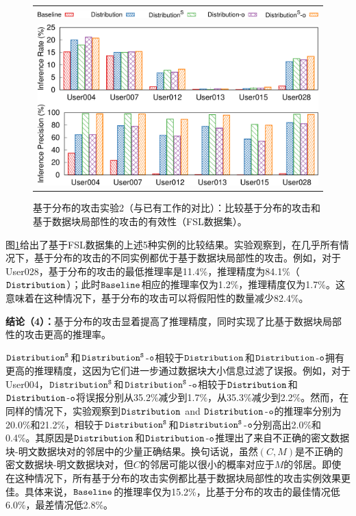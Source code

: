 \begin{figure}[!htbp]
    \centering
    \begin{tabular}{c}
        \includegraphics[width=.7\textwidth]{pic/legend-fsl-bar.pdf}\\
        \includegraphics[width=.7\textwidth]{pic/distribution-comparison-fsl.pdf} 
    \end{tabular}
    \caption{基于分布的攻击实验2（与已有工作的对比）：比较基于分布的攻击和基于数据块局部性的攻击的有效性（FSL数据集）。}
    \label{fig:distribution-comparison-fsl}
\end{figure}

图\ref{fig:distribution-comparison-fsl}给出了基于FSL数据集的上述5种实例的比较结果。实验观察到，在几乎所有情况下，基于分布的攻击的不同实例都优于基于数据块局部性的攻击。例如，对于User028，基于分布的攻击的最低推理率是11.4\%，推理精度为84.1\%（$\tt Distribution$）；此时$\tt Baseline$相应的推理率仅为1.2\%，推理精度仅为1.7\%。这意味着在这种情况下，基于分布的攻击可以将假阳性的数量减少82.4\%。

\textbf{结论（4）：}基于分布的攻击显着提高了推理精度，同时实现了比基于数据块局部性的攻击更高的推理率。 

$\tt Distribution^S$和$\tt Distribution^S$-$\tt o$相较于$\tt Distribution$和$\tt Distribution$-$\tt o$拥有更高的推理精度，这因为它们进一步通过数据块大小信息过滤了误报。例如，对于User004，$\tt Distribution^S$和$\tt Distribution^S$-$\tt o$相较于$\tt Distribution$和$\tt Distribution$-$\tt o$将误报分别从35.2\%减少到1.7\%，从35.3\%减少到2.2\%。然而，在同样的情况下，实验观察到$\tt Distribution$ and $\tt Distribution$-$\tt o$的推理率分别为20.0\%和21.2\%，相较于$\tt Distribution^S$和$\tt Distribution^S$-$\tt o$分别高出2.0\%和0.4\%。其原因是$\tt Distribution$和$\tt Distribution$-$\tt o$推理出了来自不正确的密文数据块-明文数据块对的邻居中的少量正确结果。换句话说，虽然$(C, M)$是不正确的密文数据块-明文数据块对，但$C$的邻居可能以很小的概率对应于$M$的邻居。即使在这种情况下，所有基于分布的攻击实例都比基于数据块局部性的攻击实例效果更佳。具体来说，$\tt Baseline$的推理率仅为15.2\%，比基于分布的攻击的最佳情况低6.0\%，最差情况低2.8\%。  

